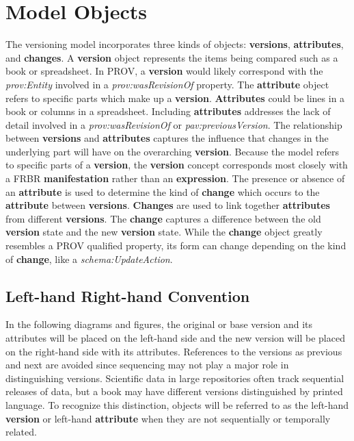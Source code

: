 \section{Model Objects}

The versioning model incorporates three kinds of objects: \textbf{versions}, \textbf{attributes}, and \textbf{changes}.
A \textbf{version} object represents the items being compared such as a book or spreadsheet.
In PROV, a \textbf{version} would likely correspond with the \textit{prov:Entity} involved in a \textit{prov:wasRevisionOf} property.
The \textbf{attribute} object refers to specific parts which make up a \textbf{version}.
\textbf{Attributes} could be lines in a book or columns in a spreadsheet.
Including \textbf{attributes} addresses the lack of detail involved in a \textit{prov:wasRevisionOf} or \textit{pav:previousVersion}.
The relationship between \textbf{versions} and \textbf{attributes} captures the influence that changes in the underlying part will have on the overarching \textbf{version}.
Because the model refers to specific parts of a \textbf{version}, the \textbf{version} concept corresponds most closely with a FRBR \textbf{manifestation} rather than an \textbf{expression}.
The presence or absence of an \textbf{attribute} is used to determine the kind of \textbf{change} which occurs to the \textbf{attribute} between \textbf{versions}.
\textbf{Changes} are used to link together \textbf{attributes} from different \textbf{versions}.
The \textbf{change} captures a difference between the old \textbf{version} state and the new \textbf{version} state.
While the \textbf{change} object greatly resembles a PROV qualified property, its form can change depending on the kind of \textbf{change}, like a \textit{schema:UpdateAction}.

\subsection{Left-hand Right-hand Convention}

In the following diagrams and figures, the original or base version and its attributes will be placed on the left-hand side and the new version will be placed on the right-hand side with its attributes.
References to the versions as previous and next are avoided since sequencing may not play a major role in distinguishing versions.
Scientific data in large repositories often track sequential releases of data, but a book may have different versions distinguished by printed language.
To recognize this distinction, objects will be referred to as the left-hand \textbf{version} or left-hand \textbf{attribute} when they are not sequentially or temporally related.

